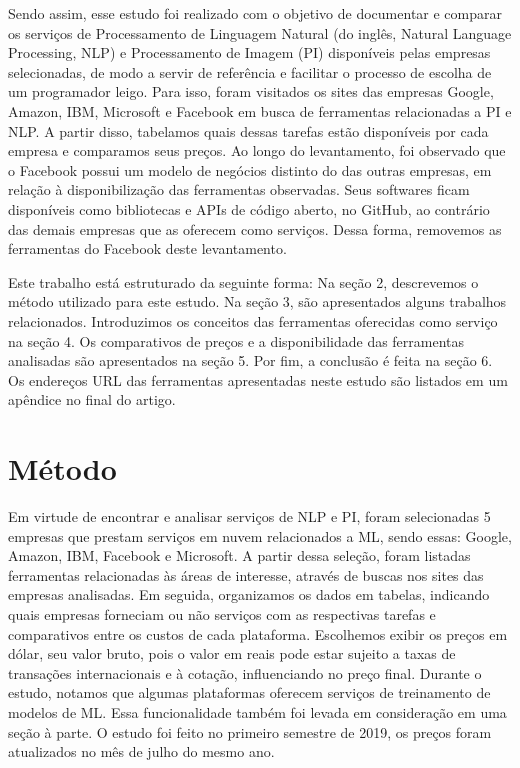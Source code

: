 \documentclass{article}
\begin{document}
Sendo assim, esse estudo foi realizado com o objetivo de documentar e comparar os serviços de Processamento de Linguagem Natural (do inglês, Natural Language Processing, NLP) e Processamento de Imagem (PI) disponíveis pelas empresas selecionadas, de modo a servir de referência e facilitar o processo de escolha de um programador leigo. Para isso, foram visitados os sites das empresas Google, Amazon, IBM, Microsoft e Facebook em busca de ferramentas relacionadas a PI e NLP. A partir disso, tabelamos quais dessas tarefas estão disponíveis por cada empresa e comparamos seus preços. Ao longo do levantamento, foi observado que o Facebook possui um modelo de negócios distinto do das outras empresas, em relação à disponibilização das ferramentas observadas. Seus softwares ficam disponíveis como bibliotecas e APIs de código aberto, no GitHub, ao contrário das demais empresas que as oferecem como serviços. Dessa forma, removemos as ferramentas do Facebook deste levantamento.

Este trabalho está estruturado da seguinte forma: Na seção 2, descrevemos o método utilizado para este estudo. Na seção 3, são apresentados alguns trabalhos relacionados. Introduzimos os conceitos das ferramentas oferecidas como serviço na seção 4. Os comparativos de preços e a disponibilidade das ferramentas analisadas são apresentados na seção 5. Por fim, a conclusão é feita na seção 6. Os endereços URL das ferramentas apresentadas neste estudo são listados em um apêndice no final do artigo.

\section{Método}
Em virtude de encontrar e analisar serviços de NLP e PI, foram selecionadas 5 empresas que prestam serviços em nuvem relacionados a ML, sendo essas: Google, Amazon, IBM, Facebook e Microsoft. A partir dessa seleção, foram listadas ferramentas relacionadas às áreas de interesse, através de buscas nos sites das empresas analisadas. Em seguida, organizamos os dados em tabelas, indicando quais empresas forneciam ou não serviços com as respectivas tarefas e comparativos entre os custos de cada plataforma. Escolhemos exibir os preços em dólar, seu valor bruto, pois o valor em reais pode estar sujeito a taxas de transações internacionais e à cotação, influenciando no preço final. Durante o estudo, notamos que algumas plataformas oferecem serviços de treinamento de modelos de ML. Essa funcionalidade também foi levada em consideração em uma seção à parte. O estudo foi feito no primeiro semestre de 2019, os preços foram atualizados no mês de julho do mesmo ano.
\end{document}
